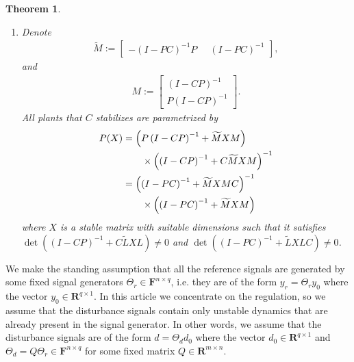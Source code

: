 \documentclass[11pt, a4paper]{amsart}
\newcommand{\inv}{^{-1}}
\newtheorem{theorem}{Theorem}[section]
\newcommand{\measurement}{y}								%
\newcommand{\reference}{\measurement_r}						%
\newcommand{\disturbance}{d}								%
\newcommand{\Plant}{P}										%
\newcommand{\Cont}{C}										%
\newcommand{\Gen}{\Theta}									%
\newcommand{\stable}{\mathbf{R}}							%
\newcommand{\fractions}[1]{\mathbf{F}} %
\begin{document}
\begin{theorem}
\begin{enumerate}[1.]
\item Denote
\begin{align}\label{eq:ErrorTM}
\widetilde{M} :=\begin{bmatrix}
-\left(I-\Plant\Cont\right)\inv \Plant\;\; & \left(I-\Plant\Cont\right)\inv
\end{bmatrix},
\end{align}
and
\begin{align}\label{eq:ErrorTM0}
M :=\begin{bmatrix}
\left(I-\Cont\Plant\right)\inv \\
\Plant\left(I-\Cont\Plant\right)\inv 
\end{bmatrix}.
\end{align}
All plants that $\Cont$ stabilizes are parametrized by
\begin{subequations}
\begin{align}\label{eqn:AllStabilizedPlants}
\Plant(X) & =\left(\Plant\left(I-\Cont\Plant\right)\inv +\widetilde{M}XM\right)\notag\\
&\qquad \times\left(\left(I-\Cont\Plant\right)\inv +\Cont \widetilde{M}XM\right)\inv \\
& =\left(\left(I-\Plant\Cont\right)\inv +\widetilde{M}XM\Cont\right)\inv \notag\\
&\qquad \times\left(\left(I-\Plant\Cont\right)\inv +\widetilde{M}XM\right)
\end{align}
\end{subequations}
where $X$ is a stable matrix with suitable dimensions such that it satisfies $\det\left(\left(I-\Cont\Plant\right)\inv +\Cont \widetilde{L}XL\right)\neq 0$ and $\det\left(\left(I-\Plant\Cont\right)\inv +\widetilde{L}XL\Cont\right)\neq 0$.
\end{enumerate}
\end{theorem}

We make the standing assumption that all the reference signals are generated by some fixed signal generators $\Gen_r\in\fractions{\stable}^{n\times q}$, i.e. they are of the form $\reference=\Gen_r\measurement_0$ where the vector $\measurement_0\in\stable^{q\times 1}$. In this article we concentrate on the regulation, so we assume that the disturbance signals contain only unstable dynamics that are already present in the signal generator. In other words, we assume that the disturbance signals are of the form $\disturbance=\Gen_d\disturbance_0$ where the vector $\disturbance_0\in\stable^{q\times 1}$ and $\Gen_d=Q\Gen_r\in\fractions{\stable}^{n\times q}$ for some fixed matrix $Q\in\stable^{m\times n}$.
\end{document}
